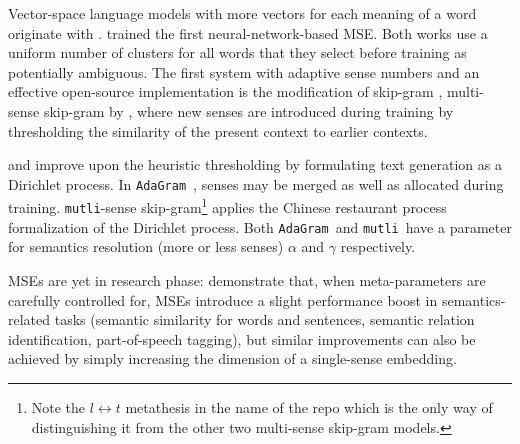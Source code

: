 \documentclass[11pt]{article}
\newcommand{\adagram}{\texttt{AdaGram}}
\newcommand{\mutli}{\texttt{mutli}}
\begin{document}
\label{sec:mse}

Vector-space language models with more vectors for each meaning of a
word originate with \cite{Reisinger:2010}.
\cite{Huang:2012} trained the first neural-network-based MSE.
Both works use a uniform number of clusters for all words that they select
before training as potentially ambiguous.
The first system with adaptive sense numbers and an effective open-source
implementation is the
modification of skip-gram \cite{Mikolov:2013d}, multi-sense skip-gram by
\cite{Neelakantan:2014}, where new senses are introduced during training by
thresholding the similarity of the present context to earlier contexts.



\cite{Bartunov:2015} and \cite{Li:2015} improve upon the heuristic thresholding
by formulating text generation as a Dirichlet process. In
\adagram~\citep{Bartunov:2015}, senses may be merged as well as allocated
during training. \mutli-sense skip-gram\footnote{Note the $l\leftrightarrow
t$ metathesis in the name of the repo which is the only way of distinguishing it
from the other two multi-sense skip-gram models.} \citep{Li:2015} applies the
Chinese restaurant process formalization of the Dirichlet process. Both
\adagram~and \mutli~have a parameter for semantics resolution (more or less
senses) $\alpha$ and $\gamma$ respectively.


MSEs are yet in research phase: \cite{Li:2015}  demonstrate that, when
meta-parameters are carefully controlled for, MSEs introduce a slight
performance boost in semantics-related tasks (semantic similarity for words and
sentences, semantic relation identification, part-of-speech tagging), but
similar improvements can also be achieved by simply increasing the dimension of
a single-sense embedding.
\end{document}
